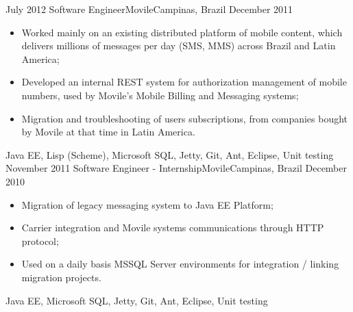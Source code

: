 \begin{experiences}
  \experience
    {July 2012} {Software Engineer}{Movile}{Campinas, Brazil}
    {December 2011}    {
          \begin{itemize}
            \item Worked mainly on an existing distributed platform of mobile content, which delivers millions of
            messages per day (SMS, MMS) across Brazil and Latin America;
            \item Developed an internal REST system for authorization management of mobile numbers,
             used by Movile's Mobile Billing and Messaging systems;
            \item Migration and troubleshooting of users subscriptions, from companies bought by Movile at that time in Latin America.\\
          \end{itemize}
        }{Java EE, Lisp (Scheme), Microsoft SQL, Jetty, Git, Ant, Eclipse, Unit testing}
  \emptySeparator
  \experience
  {November 2011} {Software Engineer - Internship}{Movile}{Campinas, Brazil}
  {December 2010}
        {
          \begin{itemize}
            \item Migration of legacy messaging system to Java EE Platform;
            \item Carrier integration and Movile systems communications through HTTP protocol;
            \item Used on a daily basis MSSQL Server environments for integration / linking migration projects.\\
          \end{itemize}
        }{Java EE, Microsoft SQL, Jetty, Git, Ant, Eclipse, Unit testing}
\end{experiences}
